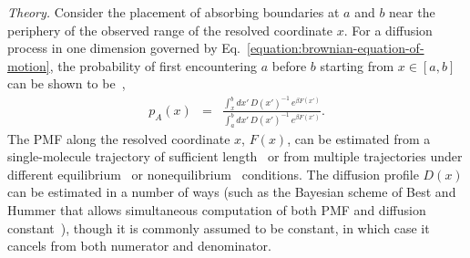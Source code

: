 \documentclass[aps,prl,twocolumn,superscriptaddress,floatfix]{revtex4-1}
\begin{document}
\noindent\emph{Theory.} 
Consider the placement of absorbing boundaries at $a$ and $b$ near the periphery of the observed range of the resolved coordinate $x$.
For a diffusion process in one dimension governed by Eq.~\ref{equation:brownian-equation-of-motion}, the probability of first encountering $a$ before $b$ starting from $x \in [a,b]$ can be shown to be~\cite{gardiner:handbook-of-stochastic-methods,rhee:jpcb:2005:splitting-probability,best-hummer:2010:pnas:coordinate-dependent-diffusion},
\begin{eqnarray}
p_A(x) &=& \frac{\int_{x}^{b} dx' \, D(x')^{-1} \, e^{\beta F(x')}}{\int_{a}^{b} dx' \, D(x')^{-1} \, e^{\beta F(x')}} \label{equation:splitting-probability-from-pmf} .
\end{eqnarray}
The PMF along the resolved coordinate $x$, $F(x)$, can be estimated from a single-molecule trajectory of sufficient length~\cite{woodside:science:2006:dna-hairpin-optical-trap,rief:2010:pnas:gcn4-pmf} or from multiple trajectories under different equilibrium~\cite{shirts-chodera:jcp:2008:mbar} or nonequilibrium~\cite{minh-adib:prl:2008:bidirectional-pulling,minh-chodera:jcp:2009:bidirectional-pulling} conditions.
The diffusion profile $D(x)$ can be estimated in a number of ways (such as the Bayesian scheme of Best and Hummer that allows simultaneous computation of both PMF and diffusion constant~\cite{best-hummer:2010:pnas:coordinate-dependent-diffusion}), though it is commonly assumed to be constant, in which case it cancels from both numerator and denominator.
\end{document}
